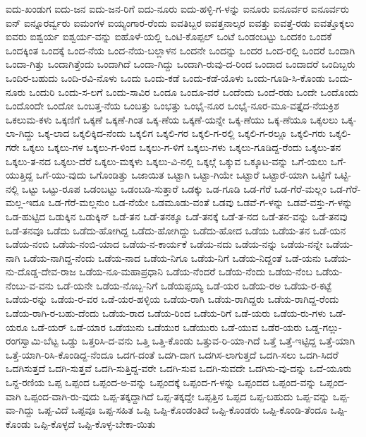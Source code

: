 ಐದು-ಖಂಡುಗ
ಐದು-ಜನ
ಐದು-ಜನ-ರಿಗೆ
ಐದು-ನೂರು
ಐದು-ಹಳ್ಳಿ-ಗ-ಳನ್ನು
ಐನೂರು
ಐನೂರ್ವರ
ಐನೂರ್ವರು
ಐನ್
ಐನ್ನೂರರ್ವ್ವರು
ಐಮಂಗಳ
ಐಯ್ಯಂಗಾರ-ರೆಂದು
ಐವತಿಬ್ಬರ
ಐವತ್ತನಾಲ್ಕರ
ಐವತ್ತು
ಐವತ್ತೆ-ರಡು
ಐವತ್ತೊಕ್ಕಲು
ಐವರು
ಐಶ್ವರ್ಯ
ಐಶ್ವರ್ಯ-ವನ್ನು
ಐಹೊಳೆ-ಯಲ್ಲಿ
ಒಂಟಿ-ಕೊಪ್ಪಲ್
ಒಂಟೆ
ಒಂಡಂಬಟ್ಟು
ಒಂದಕಂ
ಒಂದಕೆ
ಒಂದಕ್ಕಿಂತ
ಒಂದಕ್ಕೆ
ಒಂದ-ನೆಯ
ಒಂದ-ನೆಯ-ಬಲ್ಲಾಳನ
ಒಂದನೇ
ಒಂದನ್ನು
ಒಂದರ
ಒಂದ-ರಲ್ಲಿ
ಒಂದರೆ
ಒಂದಾಗಿ
ಒಂದಾ-ಗಿತ್ತು
ಒಂದಾಗಿತ್ತೆಂದು
ಒಂದಾಗಿದೆ
ಒಂದಾ-ಗಿದ್ದು
ಒಂದಾಗಿ-ರುವು-ದ-ರಿಂದ
ಒಂದಾದ
ಒಂದಾದರೆ
ಒಂದಿಬ್ಬರು
ಒಂದಿರ-ಬಹುದು
ಒಂದಿ-ರವಿ-ನೊಳು
ಒಂದು
ಒಂದು-ಕಡೆ
ಒಂದು-ಕಡೆ-ಯೊಳು
ಒಂದು-ಗೂಡಿ-ಸಿ-ಕೊಂಡು
ಒಂದು-ನೂರು
ಒಂದುರಿ
ಒಂದು-ಸ-ಲಗೆ
ಒಂದು-ಸಾವಿರ
ಒಂದೂ
ಒಂದೂ-ವರೆ
ಒಂದೆಂದು
ಒಂದೆ-ರಡು
ಒಂದೇ
ಒಂದೊಂದು
ಒಂದೊಂದೇ
ಒಂದೋ
ಒಂಬತ್ತ-ನೆಯ
ಒಂಬತ್ತು
ಒಂಭತ್ತು
ಒಂಭೈ-ನೂರ
ಒಂಭೈ-ನೂರ-ಮೂ-ವತ್ತೈದ-ನೆಯಕ್ರಿಶ
ಒಕಲುಮ-ಕಳು
ಒಕ್ಕಣಿಗೆ
ಒಕ್ಕಣೆ
ಒಕ್ಕಣೆ-ಗಿಂತ
ಒಕ್ಕ-ಣೆಯ
ಒಕ್ಕಣೆ-ಯನ್ನೇ
ಒಕ್ಕ-ಣೆಯು
ಒಕ್ಕ-ಣೆಯೂ
ಒಕ್ಕಲಲು
ಒಕ್ಕ-ಲಾ-ಗಿದ್ದು
ಒಕ್ಕ-ಲಾದ
ಒಕ್ಕಲಿಕ್ಕಿದ-ನೆಂದು
ಒಕ್ಕಲಿಗ
ಒಕ್ಕಲಿ-ಗರ
ಒಕ್ಕಲಿ-ಗ-ರಲ್ಲಿ
ಒಕ್ಕಲಿ-ಗ-ರಲ್ಲೂ
ಒಕ್ಕಲಿ-ಗರು
ಒಕ್ಕಲಿ-ಗರೇ
ಒಕ್ಕಲು
ಒಕ್ಕಲು-ಗಳ
ಒಕ್ಕಲು-ಗ-ಳಿಂದ
ಒಕ್ಕಲು-ಗ-ಳಿಗೆ
ಒಕ್ಕಲು-ಗಳು
ಒಕ್ಕಲು-ಗೂಡಿದ್ದ-ರೆಂದು
ಒಕ್ಕಲು-ತನ
ಒಕ್ಕಲು-ತ-ನದ
ಒಕ್ಕಲು-ದೆರೆ
ಒಕ್ಕಲು-ಮಕ್ಕಳು
ಒಕ್ಕಲು-ವಿ-ನಲ್ಲಿ
ಒಕ್ಕಲ್ಗೆ
ಒಕ್ಕುವ
ಒಕ್ಕೂಟ-ವನ್ನು
ಒಗೆ-ಯಲು
ಒಗೆ-ಯುತ್ತಿದ್ದ
ಒಗೆ-ಯು-ವುದು
ಒಗೊಂಡಿತ್ತು
ಒಜಾಯಿತ
ಒಟ್ಟಾಗಿ
ಒಟ್ಟಾ-ಗಿಯೇ
ಒಟ್ಟಾರೆ
ಒಟ್ಟಾರೆ-ಯಾಗಿ
ಒಟ್ಟಿಗೆ
ಒಟ್ಟಿ-ನಲ್ಲಿ
ಒಟ್ಟು
ಒಟ್ಟು-ರೂಪ
ಒಡಂಬಟ್ಟು
ಒಡಂಬಡಿ-ಸುತ್ತಾರೆ
ಒಡಕ್ಕು
ಒಡ-ಗೂಡಿ
ಒಡ-ಗೆರೆ
ಒಡ-ಗೆರೆ-ಮಲ್ಲಂ
ಒಡ-ಗೆರೆ-ಮಲ್ಲ-ಇದೂ
ಒಡ-ಗೆರೆ-ಮಲ್ಲನುಂ
ಒಡ-ನೆಯೇ
ಒಡಮೂಡು-ವಂತೆ
ಒಡವು
ಒಡವೆ-ಗ-ಳನ್ನು
ಒಡವೆ-ವಸ್ತು-ಗ-ಳನ್ನು
ಒಡ-ಹುಟ್ಟಿದ
ಒಡುಕ್ಕಿನ
ಒಡುಕ್ಕಿನ್
ಒಡೆ-ತನ
ಒಡೆ-ತನಕ್ಕೂ
ಒಡೆ-ತನಕ್ಕೆ
ಒಡೆ-ತ-ನದ
ಒಡೆ-ತನ-ವನ್ನು
ಒಡೆ-ತನವು
ಒಡೆ-ತನವೂ
ಒಡೆದು
ಒಡೆದು-ಹೋಗಿದ್ದ
ಒಡೆದು-ಹೋಗಿದ್ದು
ಒಡೆದು-ಹೋದ
ಒಡೆಯ
ಒಡೆಯ-ತನ
ಒಡೆ-ಯನ
ಒಡೆಯ-ನಂಬಿ
ಒಡೆಯ-ನಂಬಿ-ಯಾದ
ಒಡೆಯ-ನ-ಕಾರ್ಯಕೆ
ಒಡೆಯ-ನದು
ಒಡೆಯ-ನನ್ನು
ಒಡೆಯ-ನನ್ನೇ
ಒಡೆಯ-ನಾಗಿ
ಒಡೆಯ-ನಾಗಿದ್ದ-ನೆಂದು
ಒಡೆಯ-ನಾದ
ಒಡೆಯ-ನಿಗೂ
ಒಡೆಯ-ನಿಗೆ
ಒಡೆಯ-ನಿದ್ದಂತೆ
ಒಡೆ-ಯನು
ಒಡೆಯ-ನು-ದೊಡ್ಡ-ದೇವ-ರಾಜ
ಒಡೆಯ-ನೂ-ಮಹಾಪ್ರಧಾನಿ
ಒಡೆಯ-ನೆಂದರೆ
ಒಡೆಯ-ನೆಂದು
ಒಡೆಯ-ನೆಂಬ
ಒಡೆಯ-ನೆಂಬು-ವ-ವನು
ಒಡೆ-ಯನೇ
ಒಡೆಯ-ನೊಬ್ಬ-ನಿಗೆ
ಒಡೆಯಪ್ಪಯ್ಯ
ಒಡೆ-ಯರ
ಒಡೆಯ-ರಅ
ಒಡೆಯ-ರ-ಕಟ್ಟೆ
ಒಡೆಯ-ರನ್ನು
ಒಡೆಯ-ರ-ವರ
ಒಡೆ-ಯರ-ಹಳ್ಳಿಯ
ಒಡೆಯ-ರಾಗಿ
ಒಡೆಯ-ರಾಗಿದ್ದರು
ಒಡೆಯ-ರಾಗಿದ್ದ-ರೆಂದು
ಒಡೆಯ-ರಾಗಿ-ರ-ಬಹು-ದೆಂದು
ಒಡೆಯ-ರಾದ
ಒಡೆಯ-ರಿಂದ
ಒಡೆಯ-ರಿಗೆ
ಒಡೆ-ಯರು
ಒಡೆಯ-ರು-ಗಳು
ಒಡೆ-ಯರೂ
ಒಡೆ-ಯರ್
ಒಡೆ-ಯಾರ
ಒಡೆಯುನು
ಒಡೆಯುರ
ಒಡೆಯುರು
ಒಡೆ-ಯುವ
ಒಡೆರ-ಯರು
ಒಡ್ಡ-ಗಲ್ಲು-ರಂಗಸ್ವಾಮಿ-ಬೆಟ್ಟ
ಒಡ್ಡು
ಒತ್ತರಿಸಿ-ದ-ವನು
ಒತ್ತಿ
ಒತ್ತಿ-ಕೊಂಡು
ಒತ್ತುವ-ರಿ-ಯಾ-ಗಿದೆ
ಒತ್ತೆ
ಒತ್ತೆ-ಇಟ್ಟಿದ್ದ
ಒತ್ತೆ-ಯಾಗಿ
ಒತ್ತೆ-ಯಾಗಿ-ರಿಸಿ-ಕೊಂಡಿದ್ದ-ನೆಂದೂ
ಒದಗ-ದಂತೆ
ಒದಗಿ-ದಾಗ
ಒದಗಿಸ-ಲಾಗುತ್ತದೆ
ಒದಗಿ-ಸಲು
ಒದಗಿ-ಸಿದರೆ
ಒದಗಿಸುತ್ತದೆ
ಒದಗಿ-ಸುತ್ತವೆ
ಒದಗಿ-ಸುತ್ತಿದ್ದ-ವರೇ
ಒದಗಿ-ಸುವ
ಒದಗಿ-ಸುವದೇ
ಒದಗಿಸು-ವು-ದನ್ನು
ಒದೆ-ಯೂರು
ಒನ್ದ-ರಣಿಯ
ಒಪ್ಪ
ಒಪ್ಪಂದ
ಒಪ್ಪಂದ-ಅ-ವನ್ನು
ಒಪ್ಪಂದಕ್ಕೆ
ಒಪ್ಪಂದ-ಗ-ಳನ್ನು
ಒಪ್ಪಂದದ
ಒಪ್ಪಂದ-ವನ್ನು
ಒಪ್ಪಂದ-ವಾಗಿ
ಒಪ್ಪಂದ-ವಾಗಿ-ರು-ವುದು
ಒಪ್ಪ-ತಕ್ಕದ್ದಾಗಿದೆ
ಒಪ್ಪ-ತಕ್ಕದ್ದೇ
ಒಪ್ಪತ್ತಿನ
ಒಪ್ಪದ
ಒಪ್ಪ-ಬಹುದು
ಒಪ್ಪ-ವನ್ನು
ಒಪ್ಪ-ವಾ-ಗಿದ್ದು
ಒಪ್ಪ-ವಿದೆ
ಒಪ್ಪವೂ
ಒಪ್ಪ-ಸಹಿತ
ಒಪ್ಪಿ
ಒಪ್ಪಿ-ಕೊಂಡಂತಿದೆ
ಒಪ್ಪಿ-ಕೊಂಡರು
ಒಪ್ಪಿ-ಕೊಂಡಿ-ತೆಂದೂ
ಒಪ್ಪಿ-ಕೊಂಡು
ಒಪ್ಪಿ-ಕೊಳ್ಳದೆ
ಒಪ್ಪಿ-ಕೊಳ್ಳ-ಬೇಕಾ-ಯಿತು
